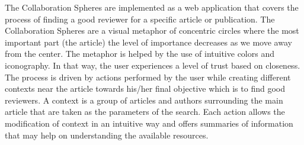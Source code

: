 The Collaboration Spheres are implemented as a web application that covers the process
of finding a good reviewer for a specific article or publication. The Collaboration Spheres are a visual metaphor of concentric circles where the most important part (the article) the level of importance decreases as we move away from the center. The metaphor is helped by the use of intuitive colors and iconography. In that way, the user experiences a level of trust based on closeness. The process is driven by actions performed by the user while creating different contexts near the article towards his/her final objective which is to find good reviewers. A context is a group of articles and authors surrounding the main article that are taken as the parameters of the search. Each action allows the modification of context in an intuitive way and offers summaries of information that may help on understanding the available resources.\\
